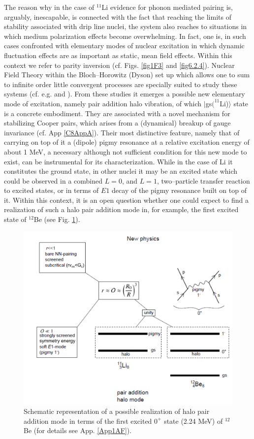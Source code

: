  The reason why in the case of $^{11}$Li evidence for phonon mediated pairing is, arguably, inescapable, is connected with the fact that reaching the limits of stability associated with drip line nuclei, the system also reaches to situations in which medium polarization effects become overwhelming. In fact, one is, in such cases confronted with elementary modes of nuclear excitation in which dynamic fluctuation effects are as important as static, mean field effects. Within this context we refer to  parity inversion (cf. Figs. \ref{fig1F3}  and \ref{fig6.2.4}). Nuclear Field Theory within the Bloch--Horowitz (Dyson) set up which allows one to sum to infinite order little convergent processes are specially suited to study these systems (cf. e.g. \citet{Barranco:01} and \citet{Gori:04}). From these studies it emerges a possible new elementary mode of excitation, namely pair addition halo vibration, of which $|$gs$(^{11}$Li)$\rangle$ state is a concrete embodiment. They are associated with a novel mechanism  for stabilizing Cooper pairs, which arises from a (dynamical) breakup of gauge invariance (cf. App \ref{C8AppA}). Their most distinctive feature, namely that of carrying on top of it a (dipole) pigmy resonance at a relative excitation energy of about 1 MeV, a necessary although not sufficient condition for this new mode to exist, can be instrumental for its characterization. While in the case of Li it constitutes the ground state, in other nuclei  it may be an excited state which could  be  observed in a combined $L=0$, and $L=1$, two--particle transfer reaction to excited states, or in terms of $E1$ decay of the pigmy resonance built on top of it. Within this context, it is an open question whether one could expect to find  a realization of such a halo pair addition mode in, for example, the first excited state of $^{12}$Be (see Fig. \ref{fig8_2_4x}).
   \begin{figure}
   \centerline{\includegraphics*[width=12cm,angle=0]{C8/figsC8/pigmy}}
   	\caption{Schematic representation of a possible realization of halo pair addition mode in terms of the first excited $0^+$ state (2.24 MeV) of $^{12}$Be (for details see App. \ref{App1AF}).}\label{fig8_2_4x}
   \end{figure}
   

